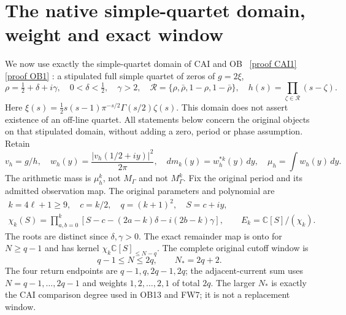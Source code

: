 \documentclass[11pt]{article}
\newcommand{\C}{\mathbb C}
\begin{document}
\section{The native simple-quartet domain, weight and exact window}

We now use exactly the simple-quartet domain of CAI and OB
\cite{CAI,OB}%
~\href{https://github.com/KokunoYumeto/zeta-function-research-reader/blob/487253b5b01851da5b9b98af4e146fecf1fab902/workbenches/splitzero-tandem/continuations/20260919-full-window-source-products/providers/CAI_COMPLETE_PREREQUISITE.tex\#L46}{[proof CAI1]} \href{https://github.com/KokunoYumeto/zeta-function-research-reader/blob/5992ad50c0f2a06921f1fcaded7b4e38097c0739/workbenches/splitzero-tandem/continuations/20260920-original-kernel-mixed-determinants/providers/OBSERVED_CLASS_RETURN.tex\#L13}{[proof OB1]}%
{}: a stipulated full simple quartet of zeros of $g=2\xi$,
\begin{equation}\label{eq:nativedomain}
 \rho=\tfrac12+\delta+i\gamma,\quad 0<\delta<\tfrac12,\quad\gamma>2,
 \quad \mathcal R=\{\rho,\bar\rho,1-\rho,1-\bar\rho\},
 \quad h(s)=\prod_{\zeta\in\mathcal R}(s-\zeta).
\end{equation}
Here $\xi(s)=\tfrac12s(s-1)\pi^{-s/2}\Gamma(s/2)\zeta(s)$.
This domain does not assert existence of an off-line quartet.
All statements below concern the original objects on that stipulated
domain, without adding a zero, period or phase assumption.
Retain
\begin{equation}\label{eq:nativeweight}
 v_h=g/h,\quad w_h(y)=\frac{|v_h(1/2+iy)|^2}{2\pi},\quad
 dm_k(y)=w_h^{*k}(y)\,dy,\quad
 \mu_h=\int w_h(y)\,dy.
\end{equation}
The arithmetic mass is $\mu_h^k$, not $M_\Gamma$ and not
$M_\Gamma^k$.  Fix the original period and its admitted observation map.
The original parameters and polynomial are
\begin{equation}\label{eq:chik}
 \begin{gathered}
 k=4\ell+1\ge9,\quad c=k/2,\quad q=(k+1)^2,\quad S=c+iy,\\
 \chi_k(S)=\prod_{a,b=0}^k
 [S-c-(2a-k)\delta-i(2b-k)\gamma],\qquad E_k=\C[S]/(\chi_k).
 \end{gathered}
\end{equation}
The roots are distinct since $\delta,\gamma>0$.  The exact remainder map
is onto for $N\ge q-1$ and has kernel $\chi_k\C[S]_{\le N-q}$.
The complete original cutoff window is
\begin{equation}\label{eq:window}
 q-1\le N\le2q,
 \qquad N_*=2q+2.
\end{equation}
The four return endpoints are $q-1,q,2q-1,2q$; the adjacent-current sum
uses $N=q-1,\ldots,2q-1$ and weights $1,2,\ldots,2,1$ of total $2q$.
The larger $N_*$ is exactly the CAI comparison degree used in OB13 and
FW7; it is not a replacement window.
\end{document}

